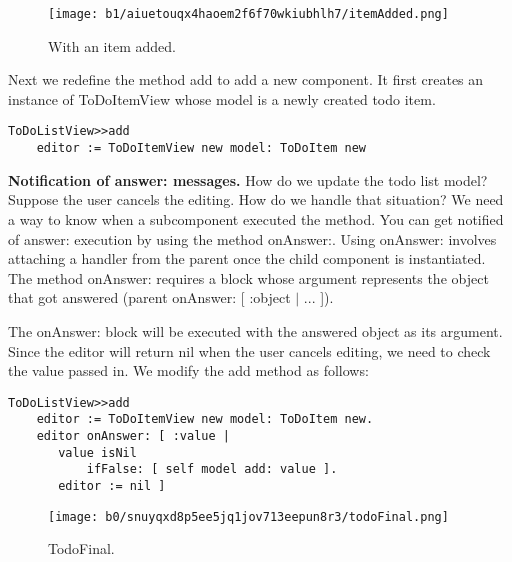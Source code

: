 \documentclass[a4paper,10pt,twoside]{book}
\newcommand{\ct}[1]{{\small\ttfamily\textup{#1}}}
\begin{document}
\begin{figure}[h!tbp]
	\begin{center}
		\texttt{[image: b1/aiuetouqx4haoem2f6f70wkiubhlh7/itemAdded.png]}
		\caption{With an item added.\label{book:inaction:todo:embeddingchildren:itemAdded}}
	\end{center}
\end{figure}

 
Next we redefine the method \ct{add} to add a new component. It first creates an instance of \ct{ToDoItemView} whose model is a newly created todo item.

\begin{lstlisting}
ToDoListView>>add
    editor := ToDoItemView new model: ToDoItem new
\end{lstlisting}

\textbf{Notification of \ct{answer:} messages.}
How do we update the todo list model?  Suppose the user cancels the editing. How do we handle that situation?  We need a way to know when a subcomponent executed the method. You can get notified of  \ct{answer:} execution by using the method \ct{onAnswer:}. Using \ct{onAnswer:} involves attaching a handler from the parent once the child component is instantiated. The method \ct{onAnswer:} requires a block whose argument represents the object that got answered (\ct{parent onAnswer: {[} :object $|$ ... {]}}).

The \ct{onAnswer:} block will be executed with the answered object as its argument. Since the editor will return \ct{nil} when the user cancels editing, we need to check the value passed in. We modify the \ct{add} method as follows:

\begin{lstlisting}
ToDoListView>>add
    editor := ToDoItemView new model: ToDoItem new.
    editor onAnswer: [ :value |
       value isNil
           ifFalse: [ self model add: value ].
       editor := nil ]
\end{lstlisting}

\begin{figure}[h!tbp]
	\begin{center}
		\texttt{[image: b0/snuyqxd8p5ee5jq1jov713eepun8r3/todoFinal.png]}
		\caption{TodoFinal.\label{book:inaction:todo:embeddingchildren:todoFinal}}
	\end{center}
\end{figure}
\end{document}
